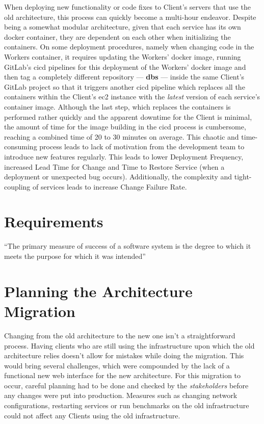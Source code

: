 When deploying new functionality or code fixes to Client's servers that use the old architecture, this process can quickly become a multi-hour endeavor. Despite being a somewhat modular architecture, given that each service has its own docker container, they are dependent on each other when initializing the containers. On some deployment procedures, namely when changing code in the Workers container, it requires updating the Workers' docker image, running GitLab's \gls{cicd} pipelines for this deployment of the Workers' docker image and then tag a completely different repository —  \textbf{dbs} — inside the same Client's GitLab project so that it triggers another \gls{cicd} pipeline which replaces all the containers within the Client's \gls{ec2} instance with the \textit{latest} version of each service's container image. Although the last step, which replaces the containers is performed rather quickly and the apparent downtime for the Client is minimal, the amount of time for the image building in the \gls{cicd} process is cumbersome, reaching a combined time of 20 to 30 minutes on average. This chaotic and time-consuming process leads to lack of motivation from the development team to introduce new features regularly. This leads to lower Deployment Frequency, increased Lead Time for Change and Time to Restore Service (when a deployment or unexpected bug occurs). Additionally, the complexity and tight-coupling of services leads to increase Change Failure Rate. 

\section{Requirements}\label{methodology:s:requirements}

``The primary measure of success of a software system is the
degree to which it meets the purpose for which it was
intended''


\section{Planning the Architecture Migration}\label{methodology:s:planning-the-architecture-migration}

Changing from the old architecture to the new one isn't a straightforward process. Having clients who are still using the infrastructure upon which the old architecture relies doesn't allow for mistakes while doing the migration. This would bring several challenges, which were compounded by the lack of a functional new web interface for the new architecture. For this migration to occur, careful planning had to be done and checked by the \textit{stakeholders} before any changes were put into production. Measures such as changing network configurations, restarting services or run benchmarks on the old infrastructure could not affect any Clients using the old infrastructure.

